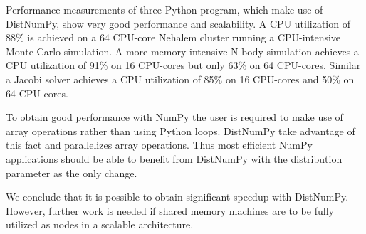 \documentclass{sigplanconf}
\begin{document}
Performance measurements of three Python program, which make use of DistNumPy, show very good performance and scalability. A CPU utilization of 88\% is achieved on a 64 CPU-core Nehalem cluster running a CPU-intensive Monte Carlo simulation. A more memory-intensive N-body simulation achieves a CPU utilization of 91\% on 16 CPU-cores but only 63\% on 64 CPU-cores. Similar a Jacobi solver achieves a CPU utilization of 85\% on 16 CPU-cores and 50\% on 64 CPU-cores.

To obtain good performance with NumPy the user is required to make use of array operations rather than using Python loops. DistNumPy take advantage of this fact and parallelizes array operations. Thus most efficient NumPy applications should be able to benefit from DistNumPy with the distribution parameter as the only change.

We conclude that it is possible to obtain significant speedup with DistNumPy. However, further work is needed if shared memory machines are to be fully utilized as nodes in a scalable architecture.











\end{document}

